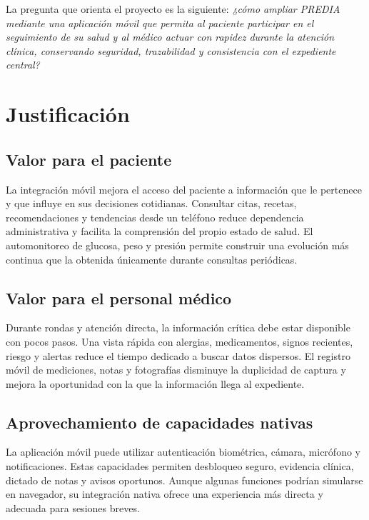 \documentclass[12pt,letterpaper]{report}
\begin{document}
La pregunta que orienta el proyecto es la siguiente: \textit{¿cómo ampliar PREDIA mediante una aplicación móvil que permita al paciente participar en el seguimiento de su salud y al médico actuar con rapidez durante la atención clínica, conservando seguridad, trazabilidad y consistencia con el expediente central?}

\section{Justificación}

\subsection{Valor para el paciente}

La integración móvil mejora el acceso del paciente a información que le pertenece y que influye en sus decisiones cotidianas. Consultar citas, recetas, recomendaciones y tendencias desde un teléfono reduce dependencia administrativa y facilita la comprensión del propio estado de salud. El automonitoreo de glucosa, peso y presión permite construir una evolución más continua que la obtenida únicamente durante consultas periódicas.

\subsection{Valor para el personal médico}

Durante rondas y atención directa, la información crítica debe estar disponible con pocos pasos. Una vista rápida con alergias, medicamentos, signos recientes, riesgo y alertas reduce el tiempo dedicado a buscar datos dispersos. El registro móvil de mediciones, notas y fotografías disminuye la duplicidad de captura y mejora la oportunidad con la que la información llega al expediente.

\subsection{Aprovechamiento de capacidades nativas}

La aplicación móvil puede utilizar autenticación biométrica, cámara, micrófono y notificaciones. Estas capacidades permiten desbloqueo seguro, evidencia clínica, dictado de notas y avisos oportunos. Aunque algunas funciones podrían simularse en navegador, su integración nativa ofrece una experiencia más directa y adecuada para sesiones breves.
\end{document}
